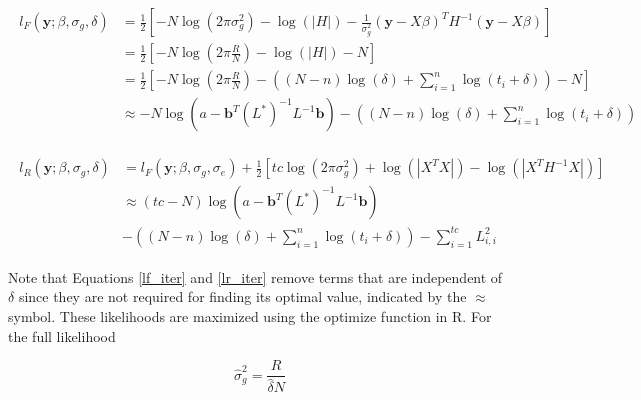         \begin{align}
        \begin{split}
            l_F(\mathbf{y}; \beta, \sigma_g, \delta) & = \frac{1}{2}\left[-N\log{(2\pi\sigma^2_g)} - \log(|H|) - \frac{1}{\sigma^2_g}(\mathbf{y}-X\beta)^T H^{-1} (\mathbf{y}-X\beta)\right] \\ 
                                                     & = \frac{1}{2}\left[-N\log{(2\pi\frac{R}{N})} - \log(|H|) - N\right] \\
                                                     & = \frac{1}{2}\left[-N\log{(2\pi\frac{R}{N})} - \left((N-n)\log{(\delta)} + \sum_{i=1}^n \log{(t_i + \delta)}\right) - N\right] \\
                                                     & \approx -N\log{(a - \mathbf{b}^T(L^*)^{-1}L^{-1}\mathbf{b})} - \left((N-n)\log{(\delta)} + \sum_{i=1}^n \log{(t_i + \delta)}\right) \label{lf_iter} 
        \end{split}
        \end{align}
        
        \begin{align}
        \begin{split}
            l_R(\mathbf{y}; \beta, \sigma_g, \delta) & = l_F(\mathbf{y}; \beta, \sigma_g, \sigma_e) + \frac{1}{2}\left[tc\log(2\pi\sigma^2_g) + \log{(|X^TX|)} - \log{(|X^TH^{-1}X|)}\right] \\
                                                     & \approx (tc-N)\log{(a - \mathbf{b}^T(L^*)^{-1}L^{-1}\mathbf{b})} \\
                                                     & -\left((N-n)\log{(\delta)} + \sum_{i=1}^n \log{(t_i + \delta)}\right) - \sum_{i=1}^{tc} L_{i,i}^2 \label{lr_iter} 
        \end{split}
        \end{align}
        
        Note that Equations \ref{lf_iter} and \ref{lr_iter} remove terms that are independent of $\delta$ since they are not required for finding its optimal value, indicated by the $\approx$ symbol. These likelihoods are maximized using the optimize function in R. For the full likelihood
        
        \begin{equation}
            \hat{\sigma}_g^2 = \frac{R}{\hat{\delta}N}
        \end{equation}
        

